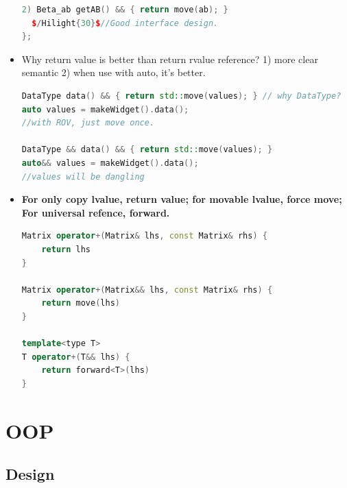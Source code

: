 \documentclass[a4paper,12pt,twoside]{book}
\begin{document}
\begin{itemize}
\begin{lstlisting}[frame=single, language=c++]
  2) Beta_ab getAB() && { return move(ab); }
  $/Hilight{30}$//Good interface design.
};
\end{lstlisting}

\item Why return value is better than return rvalue reference? 1) more clear semantic 2) when use with auto, it's better. 
\begin{lstlisting}[frame=single, language=c++]
DataType data() && { return std::move(values); } // why DataType?
auto values = makeWidget().data();
//with ROV, just move once. 

DataType && data() && { return std::move(values); }
auto&& values = makeWidget().data();
//values will be dangling
\end{lstlisting}


\item \textbf{For only copy lvalue, return value; for movable lvalue, force move;  For universal refence, forward. }
\begin{lstlisting}[frame=single, language=c++]
Matrix operator+(Matrix& lhs, const Matrix& rhs) {
    return lhs
}

Matrix operator+(Matrix&& lhs, const Matrix& rhs) {
    return move(lhs)
}

template<type T>
T operator+(T&& lhs) {
    return forward<T>(lhs)
}
\end{lstlisting}

\end{itemize}



\section{OOP}
\subsection{Design}
\end{document}
